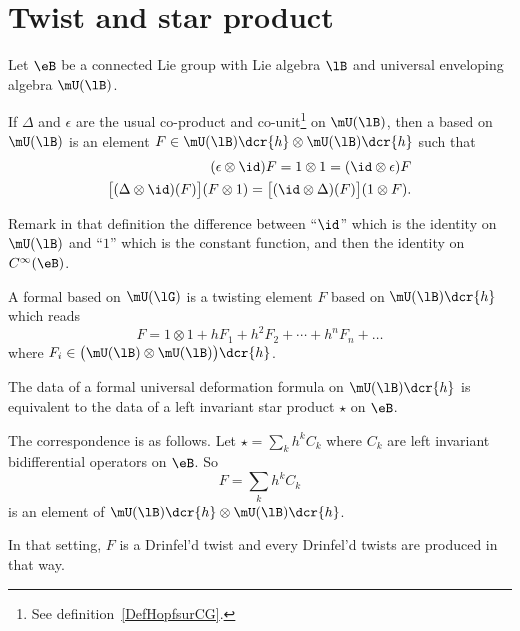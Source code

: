 \section{Twist and star product}

Let $\eB$ be a connected Lie group with Lie algebra $\lB$ and universal enveloping algebra $\mU(\lB)$.

\begin{definition}
	If $\Delta$ and $\epsilon$ are the usual co-product and co-unit\footnote{See definition~\ref{DefHopfsurCG}.} on $\mU(\lB)$, then a  based on $\mU(\lB)$ is an element $F\in\mU(\lB)\dcr{h}\otimes\mU(\lB)\dcr{h}$ such that
	\begin{subequations}
		\begin{align}
			(\epsilon\otimes\id)F=1\otimes 1=(\id\otimes \epsilon)F					\label{subEqHpfun}	\\
			\big[ (\Delta\otimes\id)(F) \big](F\otimes 1)=\big[ (\id\otimes\Delta)(F) \big](1\otimes F).	\label{subEqHpfcocs}
		\end{align}
	\end{subequations}
\end{definition}
Remark in that definition the difference between ``$\id$'' which is the identity on $\mU(\lB)$ and ``$1$'' which is the constant function, and then the identity on $ C^{\infty}(\eB)$.

\begin{definition}
	A formal  based on $\mU(\lG)$ is a twisting element $F$ based on $\mU(\lB)\dcr{h}$ which reads
	\begin{equation}
		F=1\otimes 1+hF_1+h^2F_2+\cdots+h^nF_n+\ldots
	\end{equation}
	where $F_i\in\big( \mU(\lB)\otimes\mU(\lB) \big)\dcr{h}$.
\end{definition}

\begin{theorem}
	The data of a formal universal deformation formula on $\mU(\lB)\dcr{h}$ is equivalent to the data of a left invariant star product $\star$ on $\eB$.

	The correspondence is as follows. Let $\star=\sum_k h^kC_k$ where $C_k$ are left invariant bidifferential operators on $\eB$. So
	\begin{equation}
		F=\sum_kh^kC_k
	\end{equation}
	is an element of $\mU(\lB)\dcr{h}\otimes \mU(\lB)\dcr{h}$.

	In that setting, $F$ is a Drinfel'd twist and every Drinfel'd twists are produced in that way.
\end{theorem}

